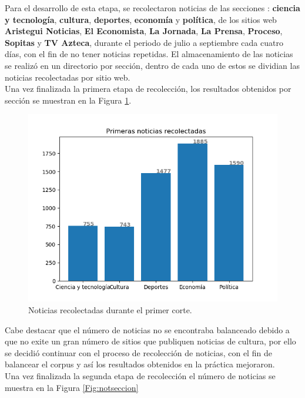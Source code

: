 Para el desarrollo de esta etapa, se recolectaron noticias de las secciones : \textbf{ciencia y tecnología}, \textbf{cultura}, \textbf{deportes}, \textbf{economía} y \textbf{política}, de los sitios web \textbf{Aristegui Noticias}, \textbf{El Economista}, \textbf{La Jornada}, \textbf{La Prensa}, \textbf{Proceso}, \textbf{Sopitas} y \textbf{TV Azteca}, durante el periodo de julio a septiembre cada cuatro días, con el fin de no tener noticias repetidas. El almacenamiento de las noticias se realizó en un directorio por sección, dentro de cada uno de estos se dividian las noticias recolectadas por sitio web. 
\\

Una vez finalizada la primera etapa de recolección, los resultados obtenidos por sección se muestran en la Figura  \ref{Fig:notseccionV1}.
\begin{figure}[H]
	\centering
	\includegraphics[scale=.6]{imagenes/Capitulo5/noticiasPorSeccionV1.png}
	\caption{Noticias recolectadas durante el primer corte.}
	\label{Fig:notseccionV1}
\end{figure}

Cabe destacar que el número de noticias no se encontraba balanceado debido a que no exite un gran número de sitios que publiquen noticias de cultura, por ello se decidió continuar con el proceso de recolección de noticias, con el fin de balancear el corpus y así los resultados obtenidos en la práctica mejoraron.
\\
Una vez finalizada la segunda etapa de recolección el número de noticias se muestra en la Figura \ref{Fig:notseccion}

